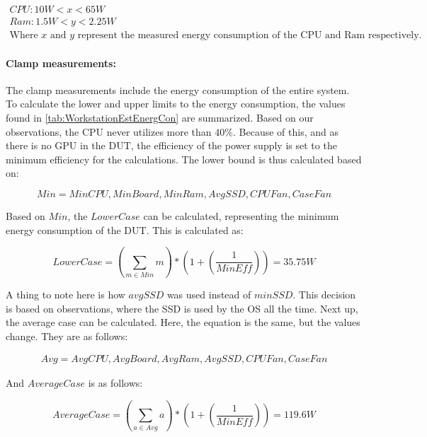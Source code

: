 \begin{gather*}
    CPU: 10W < x < 65W \\
    Ram: 1.5W < y < 2.25W \\
    \text{Where $x$ and $y$ represent the measured energy consumption of the CPU and Ram respectively.}
\end{gather*}

\paragraph{Clamp measurements:} The clamp measurements include the energy consumption of the entire system. To calculate the lower and upper limits to the energy consumption, the values found in \cref{tab:WorkstationEstEnergCon} are summarized. Based on our observations, the CPU never utilizes more than $40\%$. Because of this, and as there is no GPU in the DUT, the efficiency of the power supply is set to the minimum efficiency for the calculations. The lower bound is thus calculated based on:

\begin{equation}
    Min = {MinCPU, MinBoard, MinRam, AvgSSD, CPUFan, CaseFan}
\end{equation}

Based on $Min$, the $LowerCase$ can be calculated, representing the minimum energy consumption of the DUT. This is calculated as:

\begin{equation}
    LowerCase = \left ( \sum_{m \in Min} m \right ) * \left (1 + \left ( \frac{1}{MinEff} \right ) \right ) = 35.75W
\end{equation}

A thing to note here is how $avgSSD$ was used instead of $minSSD$. This decision is based on observations, where the SSD is used by the OS all the time. Next up, the average case can be calculated. Here, the equation is the same, but the values change. They are as follows:

\begin{eqnarray}
    Avg = {AvgCPU, AvgBoard, AvgRam, AvgSSD, CPUFan, CaseFan}
\end{eqnarray}

And $AverageCase$ is as follows:

\begin{equation}
    AverageCase = \left ( \sum_{a \in Avg} a \right ) * \left (1 + \left ( \frac{1}{MinEff} \right ) \right ) = 119.6W
\end{equation}

